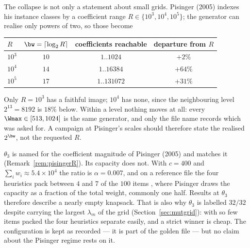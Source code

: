 
\begin{remark}\label{rem:pisingerR}
The collapse is not only a statement about small grids. Pisinger (2005) indexes his instance
classes by a coefficient range $R\in\{10^{3},10^{4},10^{5}\}$; the generator can realise only
powers of two, so those become 
\begin{center}\small
\begin{tabular}{@{}lccc@{}}
\toprule
$R$ & $\bw=\lceil\log_2R\rceil$ & coefficients reachable & departure from $R$ \\
\midrule
$10^{3}$ & $10$ & $1..1024$   & $+2\%$ \\
$10^{4}$ & $14$ & $1..16384$  & $+64\%$ \\
$10^{5}$ & $17$ & $1..131072$ & $+31\%$ \\
\bottomrule
\end{tabular}
\end{center}
Only $R=10^{3}$ has a faithful image; $10^{4}$ has none, since the neighbouring level
$2^{13}=8192$ is $18\%$ below. Within a level nothing moves at all: every $\Wmax\in[513,1024]$
is the same generator, and only the file name records which was asked for. A campaign at
Pisinger's scales should therefore state the realised $2^{\bw}$, not the requested $R$.
\end{remark}



\begin{remark}\label{rem:theta3alpha}
$\theta_3$ is named for the coefficient magnitude of Pisinger (2005) and matches it
(Remark~\ref{rem:pisingerR}). Its capacity does not. With $c=400$ and
$\sum_iw_i\approx5.4\times10^{4}$ the ratio is $\alpha=0.007$, and on a reference file the
four heuristics pack between $4$ and $7$ of the $100$ items , where Pisinger draws
the capacity as a fraction of the total weight, commonly one half. Results at $\theta_3$
therefore describe a nearly empty knapsack. That is also why $\theta_3$ is labelled $32/32$
despite carrying the largest $\lambda_m$ of the grid (Section~\ref{sec:mutgrid}): with so few
items packed the four heuristics separate easily, and a strict winner is cheap. The
configuration is kept as recorded --- it is part of the golden file --- but no claim about
the Pisinger regime rests on it.
\end{remark}


